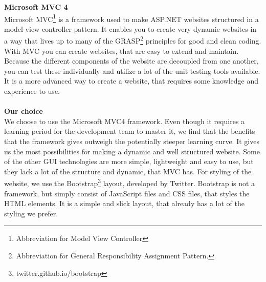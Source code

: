 \documentclass[a4paper,11pt,report]{article}
\begin{document}
\textbf{Microsoft MVC 4} \\
Microsoft MVC\footnote{Abbreviation for Model View Controller} is a framework used to make ASP.NET websites structured in a model-view-controller pattern. It enables you to create very dynamic websites in a way that lives up to many of the GRASP\footnote{Abbreviation for General Responsibility Assignment Pattern.} principles for good and clean coding. With MVC you can create websites, that are easy to extend and maintain. Because the different components of the website are decoupled from one another, you can test these individually and utilize a lot of the unit testing tools available. It is a more advanced way to create a website, that requires some knowledge and experience to use. \\ \\

\textbf{Our choice} \\
We choose to use the Microsoft MVC4 framework. Even though it requires a learning period for the development team to master it, we find that the benefits that the framework gives outweigh the potentially steeper learning curve. It gives us the most possibilities for making a dynamic and well structured website. Some of the other GUI technologies are more simple, lightweight and easy to use, but they lack a lot of the structure and dynamic, that MVC has. For styling of the website, we use the Bootstrap\footnote{twitter.github.io/bootstrap} layout, developed by Twitter. Bootstrap is not a framework, but simply consist of JavaScript files and CSS files, that styles the HTML elements. It is a simple and slick layout, that already has a lot of the styling we prefer.
\end{document}
